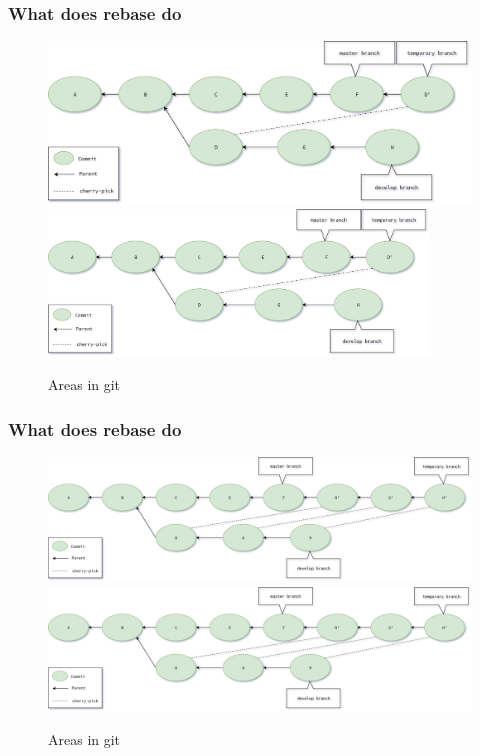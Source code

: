\begin{frame}[fragile]
    \frametitle{What does rebase do}
    \begin{figure}
        \begin{center}
            {
                \includegraphics[width=1\textwidth,keepaspectratio]{./images/Rebase_FirstCherryPick.png}
            }
            {
                \includegraphics[width=0.9\textwidth,keepaspectratio]{./images/Rebase_FirstCherryPick.png}
            }
            \caption{Areas in git}
        \end{center}
    \end{figure}
\end{frame}

\begin{frame}[fragile]
    \frametitle{What does rebase do}
    \begin{figure}
        \begin{center}
            {
                \includegraphics[width=1\textwidth,keepaspectratio]{./images/Rebase-Process.png}
            }
            {
                \includegraphics[width=1\textwidth,keepaspectratio]{./images/Rebase-Process.png}
            }
            \caption{Areas in git}
        \end{center}
    \end{figure}
\end{frame}

